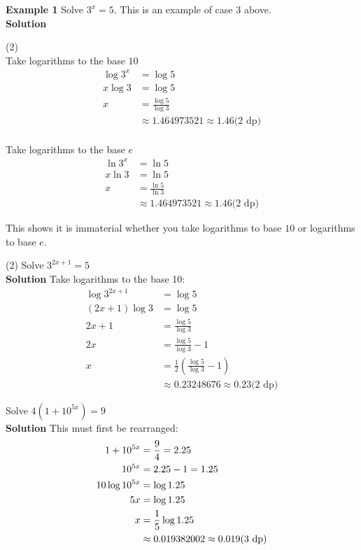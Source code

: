 \textbf{Example 1} Solve $3^{x} =5$. This is an example of case $3$ above.\\ 
\textbf{Solution} 
\begin{tasks}[label-width={5em}](2)
\task[Method 1] \\Take logarithms to the base $10$\\
\begin{align*}\log  3^{x} &  = \log  5 \\
x \log  3 &  = \log  5 \\
x &  = \frac{\log  5}{\log  3} \\
&  \approx 1.464973521 \approx 1.46\text{(2 dp)}\end{align*}
\task[Method 2] \\Take logarithms to the base $e$\\
\begin{align*}\ln  3^{x} &  = \ln  5 \\
x \ln  3 &  = \ln  5 \\
x &  = \frac{\ln  5}{\ln  3} \\
&  \approx 1.464973521 \approx 1.46\text{(2 dp)}\end{align*}
\end{tasks}
This shows it is immaterial whether you take logarithms to base $10$ or logarithms to base $e$. 
\begin{tasks}[label-width={6em}](2)
\task[Example 2]
Solve $3^{2 x +1} =5$\\
\textbf{Solution} Take logarithms to the base 10:
\begin{align*}\log  3^{2 x +1} &  = \log  5 \\
\left (2 x +1\right ) \log  3 &  = \log  5 \\
2 x +1 &  = \frac{\log  5}{\log  3} \\
2 x &  = \frac{\log  5}{\log  3} -1 \\
x &  = \frac{1}{2} \left (\frac{\log  5}{\log  3} -1\right ) \\
&  \approx 0.23248676 \approx 0.23\text{(2 dp)}\end{align*}

\task[Example 3]
Solve $4 \left (1 +10^{5 x}\right ) =9$\\
\textbf{Solution} This must first be rearranged:
\begin{align*}1 +10^{5 x} &  = \frac{9}{4} =2.25 \\
10^{5 x} &  = 2.25 -1 =1.25 \\
\text{}{\scriptsize 10}\text{}\log  10^{5 x} &  = \log  1.25 \\
5 x &  = \log  1.25 \\
x &  = \frac{1}{5} \log  1.25 \\
&  \approx 0.019382002 \approx 0.019\text{(3 dp)}\end{align*}
\end{tasks}


